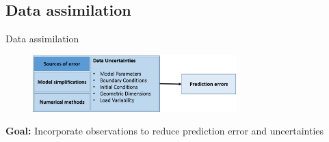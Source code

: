 \documentclass[aspectratio=169]{beamer} %
\begin{document}
\subsection{Data assimilation}
\begin{frame}{Data assimilation}
    \begin{figure}
        \centering
        \includegraphics[width=0.7\textwidth]{images/source_of_uncertainties.png}
    \end{figure}

    \textbf{Goal:} Incorporate observations to reduce prediction error and uncertainties
    \begin{figure}
        \centering
    \end{figure}

    \vfill
\end{frame}
\end{document}
